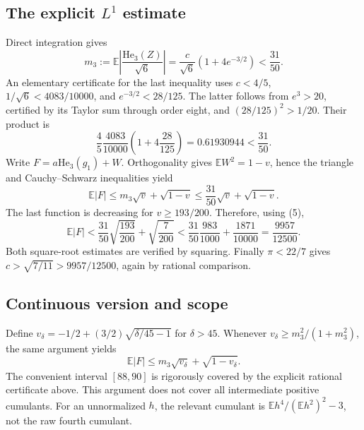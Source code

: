 \documentclass{article}
\begin{document}
\subsection*{The explicit $L^1$ estimate}
Direct integration gives
\[
 m_3:=\mathbb E\left|\frac{\mathrm{He}_3(Z)}{\sqrt6}\right|
 =\frac{c}{\sqrt6}\left(1+4e^{-3/2}\right)<\frac{31}{50}.
 \tag{6}
\]
An elementary certificate for the last inequality uses $c<4/5$,
$1/\sqrt6<4083/10000$, and $e^{-3/2}<28/125$. The latter follows from
$e^3>20$, certified by its Taylor sum through order eight, and
$(28/125)^2>1/20$. Their product is
\[
 \frac45\frac{4083}{10000}\left(1+4\frac{28}{125}\right)
 =0.61930944<\frac{31}{50}.
\]
Write $F=a\mathrm{He}_3(g_1)+W$. Orthogonality gives
$\mathbb EW^2=1-v$, hence the triangle and Cauchy--Schwarz inequalities yield
\[
 \mathbb E|F|\le m_3\sqrt v+\sqrt{1-v}
 \le\frac{31}{50}\sqrt v+\sqrt{1-v}.
\]
The last function is decreasing for $v\ge193/200$. Therefore, using (5),
\[
 \mathbb E|F|
 <\frac{31}{50}\sqrt{\frac{193}{200}}+\sqrt{\frac7{200}}
 <\frac{31}{50}\frac{983}{1000}+\frac{1871}{10000}
 =\frac{9957}{12500}.
\]
Both square-root estimates are verified by squaring. Finally $\pi<22/7$
gives $c>\sqrt{7/11}>9957/12500$, again by rational comparison.

\subsection*{Continuous version and scope}
Define $v_\delta=-1/2+(3/2)\sqrt{\delta/45-1}$ for $\delta>45$.
Whenever $v_\delta\ge m_3^2/(1+m_3^2)$, the same argument yields
\[
 \mathbb E|F|\le m_3\sqrt{v_\delta}+\sqrt{1-v_\delta}.
\]
The convenient interval $[88,90]$ is rigorously covered by the explicit
rational certificate above. This argument does not cover all intermediate
positive cumulants. For an unnormalized $h$, the relevant cumulant is
$\mathbb Eh^4/(\mathbb Eh^2)^2-3$, not the raw fourth cumulant.
\end{document}
